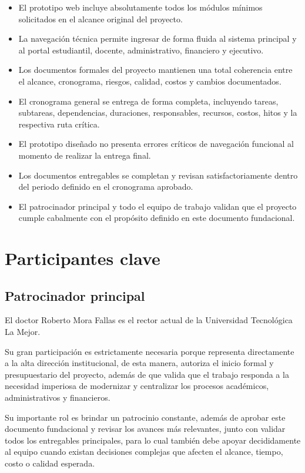 \documentclass[11pt,spanish]{article}
\begin{document}
\begin{itemize}
    \item El prototipo web incluye absolutamente todos los módulos mínimos solicitados en el alcance original del proyecto.
    \item La navegación técnica permite ingresar de forma fluida al sistema principal y al portal estudiantil, docente, administrativo, financiero y ejecutivo.
    \item Los documentos formales del proyecto mantienen una total coherencia entre el alcance, cronograma, riesgos, calidad, costos y cambios documentados.
    \item El cronograma general se entrega de forma completa, incluyendo tareas, subtareas, dependencias, duraciones, responsables, recursos, costos, hitos y la respectiva ruta crítica.
    \item El prototipo diseñado no presenta errores críticos de navegación funcional al momento de realizar la entrega final.
    \item Los documentos entregables se completan y revisan satisfactoriamente dentro del periodo definido en el cronograma aprobado.
    \item El patrocinador principal y todo el equipo de trabajo validan que el proyecto cumple cabalmente con el propósito definido en este documento fundacional.
\end{itemize}

\section{Participantes clave}

\subsection{Patrocinador principal}

El doctor Roberto Mora Fallas es el rector actual de la Universidad Tecnológica La Mejor.

Su gran participación es estrictamente necesaria porque representa directamente a la alta dirección institucional, de esta manera, autoriza el inicio formal y presupuestario del proyecto, además de que valida que el trabajo responda a la necesidad imperiosa de modernizar y centralizar los procesos académicos, administrativos y financieros.

Su importante rol es brindar un patrocinio constante, además de aprobar este documento fundacional y revisar los avances más relevantes, junto con validar todos los entregables principales, para lo cual también debe apoyar decididamente al equipo cuando existan decisiones complejas que afecten el alcance, tiempo, costo o calidad esperada.
\end{document}
